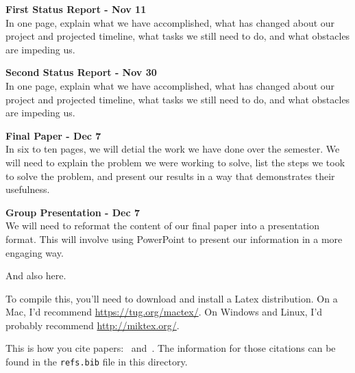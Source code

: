 \documentclass[12pt]{article}
\begin{document}
\noindent
\textbf{First Status Report - Nov 11} \\
In one page, explain what we have accomplished, what has changed about our project
and projected timeline, what tasks we still need to do, and what obstacles
are impeding us.

\noindent
\textbf{Second Status Report - Nov 30} \\
In one page, explain what we have accomplished, what has changed about our project
and projected timeline, what tasks we still need to do, and what obstacles
are impeding us.

\noindent
\textbf{Final Paper - Dec 7} \\
In six to ten pages, we will detial the work we have done over the semester. We
will need to explain the problem we were working to solve, list the steps
we took to solve the problem, and present our results in a way that 
demonstrates their usefulness.

\noindent
\textbf{Group Presentation - Dec 7} \\
We will need to reformat the content of our final paper into a presentation
format. This will involve using PowerPoint to present our information in
a more engaging way.




And also here.

To compile this, you'll need to download and install a Latex distribution.  On a Mac, I'd recommend \url{https://tug.org/mactex/}.  On Windows and Linux, I'd probably recommend \url{http://miktex.org/}.

This is how you cite papers:~\cite{Othman13:Gates} and~\cite{Pennock01:Real}.  The information for those citations can be found in the \texttt{refs.bib} file in this directory.



\end{document}

